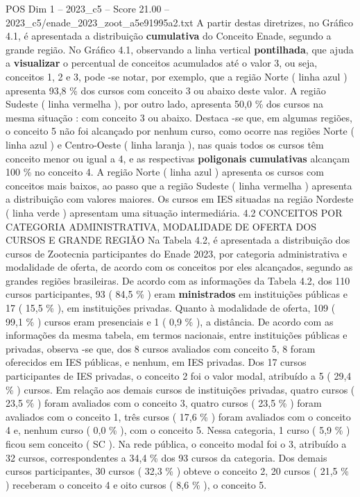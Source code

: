 \begin{textsample}{POS Dim 1 – 2023\_c5 – Score 21.00 – 2023\_c5/enade\_2023\_zoot\_a5e91995a2.txt}
A partir destas diretrizes, no Gráfico 4.1, é apresentada a distribuição \textbf{cumulativa} do Conceito Enade, segundo a grande região.
No Gráfico 4.1, observando a linha vertical \textbf{pontilhada}, que ajuda a \textbf{visualizar} o percentual de conceitos acumulados até o valor 3, ou seja, conceitos 1, 2 e 3, pode -se notar, por exemplo, que a região Norte ( linha azul ) apresenta 93,8 \% dos cursos com conceito 3 ou abaixo deste valor.
A região Sudeste ( linha vermelha ), por outro lado, apresenta 50,0 \% dos cursos na mesma situação : com conceito 3 ou abaixo.
Destaca -se que, em algumas regiões, o conceito 5 não foi alcançado por nenhum curso, como ocorre nas regiões Norte ( linha azul ) e Centro-Oeste ( linha laranja ), nas quais todos os cursos têm conceito menor ou igual a 4, e as respectivas \textbf{poligonais} \textbf{cumulativas} alcançam 100 \% no conceito 4.
A região Norte ( linha azul ) apresenta os cursos com conceitos mais baixos, ao passo que a região Sudeste ( linha vermelha ) apresenta a distribuição com valores maiores.
Os cursos em IES situadas na região Nordeste ( linha verde ) apresentam uma situação intermediária. 4.2 CONCEITOS POR CATEGORIA ADMINISTRATIVA, MODALIDADE DE OFERTA DOS CURSOS E GRANDE REGIÃO Na Tabela 4.2, é apresentada a distribuição dos cursos de Zootecnia participantes do Enade 2023, por categoria administrativa e modalidade de oferta, de acordo com os conceitos por eles alcançados, segundo as grandes regiões brasileiras.
De acordo com as informações da Tabela 4.2, dos 110 cursos participantes, 93 ( 84,5 \% ) eram \textbf{ministrados} em instituições públicas e 17 ( 15,5 \% ), em instituições privadas.
Quanto à modalidade de oferta, 109 ( 99,1 \% ) cursos eram presenciais e 1 ( 0,9 \% ), a distância.
De acordo com as informações da mesma tabela, em termos nacionais, entre instituições públicas e privadas, observa -se que, dos 8 cursos avaliados com conceito 5, 8 foram oferecidos em IES públicas, e nenhum, em IES privadas.
Dos 17 cursos participantes de IES privadas, o conceito 2 foi o valor modal, atribuído a 5 ( 29,4 \% ) cursos.
Em relação aos demais cursos de instituições privadas, quatro cursos ( 23,5 \% ) foram avaliados com o conceito 3, quatro cursos ( 23,5 \% ) foram avaliados com o conceito 1, três cursos ( 17,6 \% ) foram avaliados com o conceito 4 e, nenhum curso ( 0,0 \% ), com o conceito 5.
Nessa categoria, 1 curso ( 5,9 \% ) ficou sem conceito ( SC ).
Na rede pública, o conceito modal foi o 3, atribuído a 32 cursos, correspondentes a 34,4 \% dos 93 cursos da categoria.
Dos demais cursos participantes, 30 cursos ( 32,3 \% ) obteve o conceito 2, 20 cursos ( 21,5 \% ) receberam o conceito 4 e oito cursos ( 8,6 \% ), o conceito 5.

\end{textsample}
